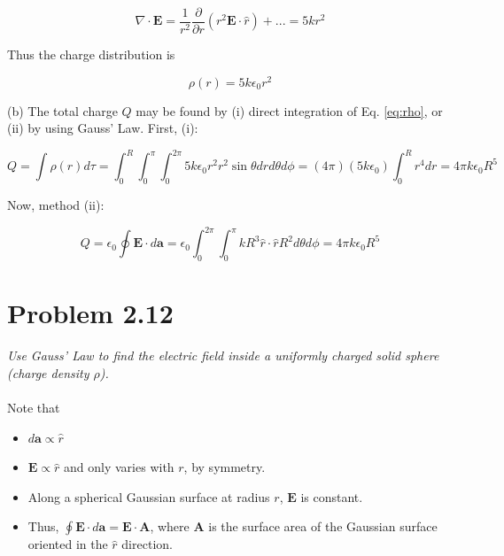 \documentclass[10pt]{article}
\begin{document}
\begin{equation}
\nabla \cdot \mathbf{E} = \frac{1}{r^2} \frac{\partial}{\partial r}\left( r^2 \mathbf{E} \cdot \hat{r} \right) + ... = 5kr^2
\end{equation} 

Thus the charge distribution is 

\begin{equation}
\rho(r) = 5 k \epsilon_0 r^2 \label{eq:rho}
\end{equation}

(b) The total charge $Q$ may be found by (i) direct integration of Eq. \ref{eq:rho}, or (ii) by using Gauss' Law.  First, (i):

\begin{equation}
Q = \int \rho(r) d\tau = \int_0^{R} \int_0^{\pi} \int_0^{2\pi} 5 k \epsilon_0 r^2 r^2 \sin\theta dr d\theta d\phi = (4\pi)(5k\epsilon_0) \int_0^{R} r^4 dr = 4\pi k \epsilon_0 R^5
\end{equation}

Now, method (ii): 

\begin{equation}
Q = \epsilon_0 \oint \mathbf{E} \cdot d\mathbf{a} = \epsilon_0 \int_0^{2\pi} \int_0^{\pi} k R^3 \hat{r} \cdot \hat{r} R^2 d\theta d\phi = 4\pi k \epsilon_0 R^5
\end{equation}

\section{Problem 2.12}

\textit{Use Gauss' Law to find the electric field inside a uniformly charged solid sphere (charge density $\rho$).} \\ \\

Note that

\begin{itemize}
\item $d\mathbf{a} \propto \hat{r}$
\item $\mathbf{E} \propto \hat{r}$ and only varies with $r$, by symmetry.
\item Along a spherical Gaussian surface at radius $r$, $\mathbf{E}$ is constant.
\item Thus, $\oint \mathbf{E} \cdot d\mathbf{a} = \mathbf{E} \cdot \mathbf{A}$, where $\mathbf{A}$ is the surface area of the Gaussian surface oriented in the $\hat{r}$ direction.
\end{itemize}
\end{document}
